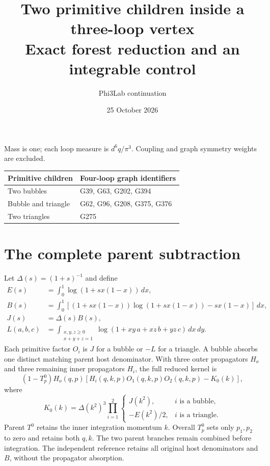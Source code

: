 \documentclass[11pt]{article}
\title{Two primitive children inside a three-loop vertex\\Exact forest reduction and an integrable control}
\author{Phi3Lab continuation}
\date{25 October 2026}
\begin{document}
\maketitle
\noindent Mass is one; each loop measure is $d^6q/\pi^3$. Coupling and graph symmetry weights are excluded.
\begin{center}\begin{tabular}{ll}\toprule
Primitive children & Four-loop graph identifiers\\\midrule
Two bubbles & G39, G63, G202, G394\\
Bubble and triangle & G62, G96, G208, G375, G376\\
Two triangles & G275\\\bottomrule
\end{tabular}\end{center}
\section*{The complete parent subtraction}
Let $\Delta(s)=(1+s)^{-1}$ and define
\begin{align}
 E(s)&=\int_0^1\log(1+s x(1-x))\,dx,\\
 B(s)&=\int_0^1[(1+s x(1-x))\log(1+s x(1-x))-s x(1-x)]\,dx,\\
 J(s)&=\Delta(s)B(s),\\
 L(a,b,c)&=\int_{\substack{x,y,z\geq0\\x+y+z=1}}
       \log(1+xy\,a+xz\,b+yz\,c)\,dx\,dy.
\end{align}
Each primitive factor $O_i$ is $J$ for a bubble or $-L$ for a triangle.
A bubble absorbs one distinct matching parent host denominator. With three outer
propagators $H_o$ and three remaining inner propagators $H_i$, the full reduced kernel is
\begin{equation}
 (1-T^0_p)H_o(q,p)\left[H_i(q,k,p)O_1(q,k,p)O_2(q,k,p)-K_0(k)\right],
\end{equation}
where
\begin{equation}
 K_0(k)=\Delta(k^2)^3\prod_{i=1}^2
 \begin{cases}J(k^2),&i\text{ is a bubble},\\-E(k^2)/2,&i\text{ is a triangle}.\end{cases}
\end{equation}
Parent $T^0$ retains the inner integration momentum $k$. Overall $T_p^0$
sets only $p_1,p_2$ to zero and retains both $q,k$. The two parent branches
remain combined before integration. The independent reference retains all original
host denominators and $B$, without the propagator absorption.
\end{document}
